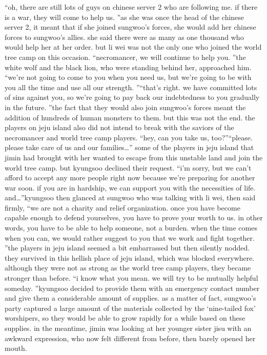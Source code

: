 “oh, there are still lots of guys on chinese server 2 who are following me.
 if there is a war, they will come to help us.
”as she was once the head of the chinese server 2, it meant that if she joined sungwoo’s forces, she would add her chinese forces to sungwoo’s allies.
she said there were as many as one thousand who would help her at her order.
but li wei was not the only one who joined the world tree camp on this occasion.
“necromancer, we will continue to help you.
”the white wolf and the black lion, who were standing behind her, approached him.
“we’re not going to come to you when you need us, but we’re going to be with you all the time and use all our strength.
”“that’s right.
 we have committed lots of sins against you, so we’re going to pay back our indebtedness to you gradually in the future.
”the fact that they would also join sungwoo’s forces meant the addition of hundreds of human monsters to them.
 but this was not the end.
the players on jeju island also did not intend to break with the saviors of the necromancer and world tree camp players.
“hey, can you take us, too?”“please.
 please take care of us and our families…”
some of the players in jeju island that jimin had brought with her wanted to escape from this unstable land and join the world tree camp.
 but kyungsoo declined their request.
“i’m sorry, but we can’t afford to accept any more people right now because we’re preparing for another war soon.
 if you are in hardship, we can support you with the necessities of life.
 and…”kyungsoo then glanced at sungwoo who was talking with li wei, then said firmly, “we are not a charity and relief organization.
 once you have become capable enough to defend yourselves, you have to prove your worth to us.
 in other words, you have to be able to help someone, not a burden.
 when the time comes when you can, we would rather suggest to you that we work and fight together.
”the players in jeju island seemed a bit embarrassed but then silently nodded.
they survived in this hellish place of jeju island, which was blocked everywhere.
 although they were not as strong as the world tree camp players, they became stronger than before.
“i know what you mean.
 we will try to be mutually helpful someday.
”kyungsoo decided to provide them with an emergency contact number and give them a considerable amount of supplies.
as a matter of fact, sungwoo’s party captured a large amount of the materials collected by the ‘nine-tailed fox’ worshipers, so they would be able to grow rapidly for a while based on these supplies.
in the meantime, jimin was looking at her younger sister jisu with an awkward expression, who now felt different from before, then barely opened her mouth.
